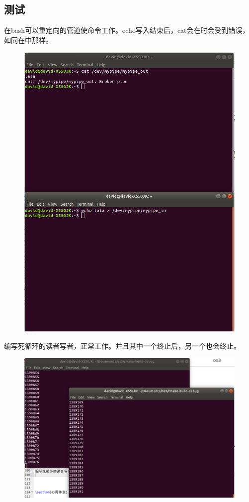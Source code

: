 \documentclass{article}
\begin{document}
\subsection{测试}
在bash可以重定向的管道使命令工作。echo写入结束后，cat会在时会受到错误，如同在中那样。
\begin{figure}[H]
\centering
\includegraphics[width=\linewidth]{echo_cat.png}
\end{figure}

编写死循环的读者写者，正常工作。并且其中一个终止后，另一个也会终止。
\begin{figure}[H]
\centering
\includegraphics[width=\linewidth]{read_write.png}
\end{figure}
\end{document}
